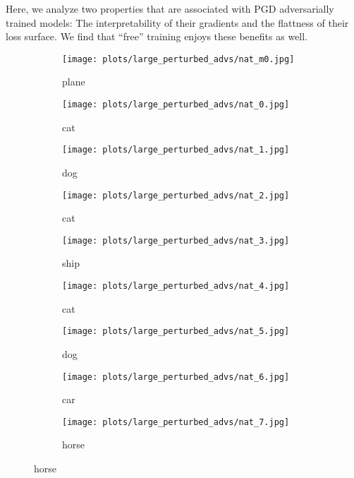 \documentclass{article}
\begin{document}
Here, we analyze two properties that are associated with PGD adversarially trained models: The interpretability of their gradients and the flattness of their loss surface.  We find that ``free'' training enjoys these benefits as well.

\captionsetup[subfigure]{labelformat=empty}
\begin{figure}[t]
    \centering
    \begin{subfigure}{0.8\linewidth}
    \centering
    \begin{minipage}[b]{0.10\linewidth}
        \texttt{[image: plots/large\_perturbed\_advs/nat\_m0.jpg]}\vspace{-2mm}\caption{plane}
    \end{minipage}
    \begin{minipage}[b]{0.10\linewidth}
        \texttt{[image: plots/large\_perturbed\_advs/nat\_0.jpg]}\vspace{-2mm}\caption{cat}
    \end{minipage}
    \begin{minipage}[b]{0.10\linewidth}
        \texttt{[image: plots/large\_perturbed\_advs/nat\_1.jpg]}\vspace{-2mm}\caption{dog}
    \end{minipage}
        \begin{minipage}[b]{0.10\linewidth}
        \texttt{[image: plots/large\_perturbed\_advs/nat\_2.jpg]}\vspace{-2mm}\caption{cat}
    \end{minipage}
        \begin{minipage}[b]{0.10\linewidth}
        \texttt{[image: plots/large\_perturbed\_advs/nat\_3.jpg]}\vspace{-2mm}\caption{ship}
    \end{minipage}
        \begin{minipage}[b]{0.10\linewidth}
        \texttt{[image: plots/large\_perturbed\_advs/nat\_4.jpg]}\vspace{-2mm}\caption{cat}
    \end{minipage}
        \begin{minipage}[b]{0.10\linewidth}
        \texttt{[image: plots/large\_perturbed\_advs/nat\_5.jpg]}\vspace{-2mm}\caption{dog}
    \end{minipage}
        \begin{minipage}[b]{0.10\linewidth}
        \texttt{[image: plots/large\_perturbed\_advs/nat\_6.jpg]}\vspace{-2mm}\caption{car}
    \end{minipage}
        \begin{minipage}[b]{0.10\linewidth}
        \texttt{[image: plots/large\_perturbed\_advs/nat\_7.jpg]}\vspace{-2mm}\caption{horse}
    \end{minipage}
    \end{subfigure}


\end{figure}
\end{document}
